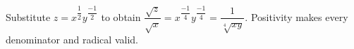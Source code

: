 Substitute $z=x^{\dfrac{1}{2}}y^{\dfrac{-1}{2}}$ to obtain $\dfrac{\sqrt z}{\sqrt x}=x^{\dfrac{-1}{4}}y^{\dfrac{-1}{4}}=\boxed{\dfrac{1}{\sqrt[4]{xy}}}$. Positivity makes every denominator and radical valid.
